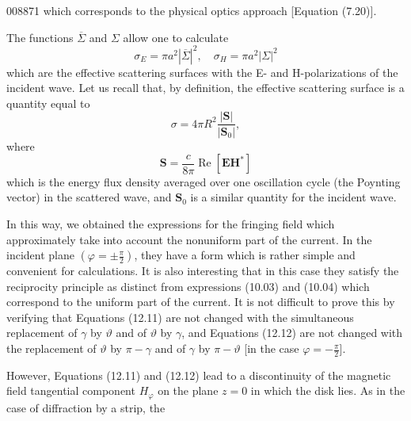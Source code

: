 \begin{scanpage}{0088}{71}
which corresponds to the physical optics approach [Equation (7.20)].

The functions $\overline\Sigma$ and $\Sigma$ allow one to calculate
\[\sigma_E=\pi a^2|\overline\Sigma|^2,\quad\sigma_H=\pi a^2|\Sigma|^2\tag{12.17}\]
which are the effective scattering surfaces with the E- and H-polarizations of the incident wave. Let us recall that, by definition, the effective scattering surface is a quantity equal to
\[\sigma=4\pi R^2\frac{|\mathbf S|}{|\mathbf S_0|},\tag{12.18}\]
where
\[\mathbf S=\frac{c}{8\pi}\operatorname{Re}[\mathbf E\mathbf H^*]\tag{12.19}\]
which is the energy flux density averaged over one oscillation cycle (the Poynting vector) in the scattered wave, and $\mathbf S_0$ is a similar quantity for the incident wave.

In this way, we obtained the expressions for the fringing field which approximately take into account the nonuniform part of the current. In the incident plane $(\varphi=\pm\frac\pi2)$, they have a form which is rather simple and convenient for calculations. It is also interesting that in this case they satisfy the reciprocity principle as distinct from expressions (10.03) and (10.04) which correspond to the uniform part of the current. It is not difficult to prove this by verifying that Equations (12.11) are not changed with the simultaneous replacement of $\gamma$ by $\vartheta$ and of $\vartheta$ by $\gamma$, and Equations (12.12) are not changed with the replacement of $\vartheta$ by $\pi-\gamma$ and of $\gamma$ by $\pi-\vartheta$ [in the case $\varphi=-\frac\pi2$].

However, Equations (12.11) and (12.12) lead to a discontinuity of the magnetic field tangential component $H_\varphi$ on the plane $z=0$ in which the disk lies. As in the case of diffraction by a strip, the
\end{scanpage}
